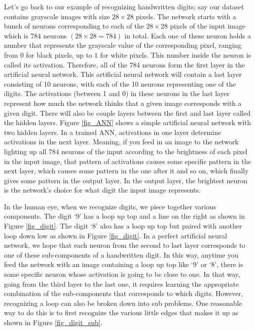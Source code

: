 \documentclass[master]{thesis-uestc}
\begin{document}
Let's go back to our example of recognizing handwritten digits; say our dataset contains grayscale images with size $28 \times 28$ pixels. The network starts with a bunch of neurons corresponding to each of the $28 \times 28$ pixels of the input image which is 784 neurons $(28 \times 28 = 784)$ in total. Each one of these neuron holds a number that represents the grayscale value of the corresponding pixel, ranging from $0$ for black pixels, up to $1$ for white pixels. This number inside the neuron is called its activation. Therefore, all of the 784 neurons form the first layer in the artificial neural network. This artificial neural network will contain a last layer consisting of 10 neurons, with each of the 10 neurons representing one of the digits. The activations (between 1 and 0) in these neurons in the last layer represent how much the network thinks that a given image corresponds with a given digit. There will also be couple layers between the first and last layer called the hidden layers. Figure \ref{fig_ANN} shows a simple artificial neural network with two hidden layers. In a trained ANN, activations in one layer determine activations in the next layer. Meaning, if you feed in an image to the network lighting up all 784 neurons of the input according to the brightness of each pixel in the input image, that pattern of activations causes some specific pattern in the next layer, which causes some pattern in the one after it and so on, which finally gives some pattern in the output layer. In the output layer, the brightest neuron is the network's choice for what digit the input image represents.

In the human eye, when we recognize digits, we piece together various components. The digit `9' has a loop up top and a line on the right as shown in Figure \ref{fig_digit}. The digit `8' also has a loop up top but paired with another loop down low as shown in Figure \ref{fig_digit}. In a perfect artificial neural network, we hope that each neuron from the second to last layer corresponds to one of these sub-components of a handwritten digit. In this way, anytime you feed the network with an image containing a loop up top like `9' or `8', there is some specific neuron whose activation is going to be close to one. In that way, going from the third layer to the last one, it requires learning the appropriate combination of the sub-components that corresponds to which digits. However, recognizing a loop can also be broken down into sub problems. One reasonable way to do this is to first recognize the various little edges that makes it up as shown in Figure \ref{fig_digit_sub}.
\end{document}
